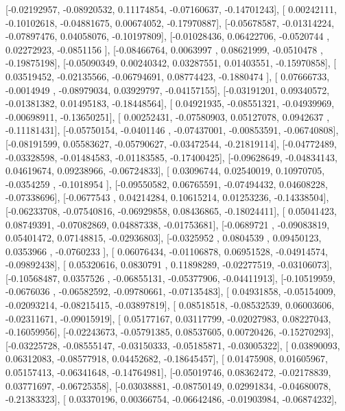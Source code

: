 \documentclass{article}
\begin{document}
       [-0.02192957, -0.08920532,  0.11174854, -0.07160637, -0.14701243],
       [ 0.00242111, -0.10102618, -0.04881675,  0.00674052, -0.17970887],
       [-0.05678587, -0.01314224, -0.07897476,  0.04058076, -0.10197809],
       [-0.01028436,  0.06422706, -0.0520744 ,  0.02272923, -0.0851156 ],
       [-0.08466764,  0.0063997 ,  0.08621999, -0.0510478 , -0.19875198],
       [-0.05090349,  0.00240342,  0.03287551,  0.01403551, -0.15970858],
       [ 0.03519452, -0.02135566, -0.06794691,  0.08774423, -0.1880474 ],
       [ 0.07666733, -0.0014949 , -0.08979034,  0.03929797, -0.04157155],
       [-0.03191201,  0.09340572, -0.01381382,  0.01495183, -0.18448564],
       [ 0.04921935, -0.08551321, -0.04939969, -0.00698911, -0.13650251],
       [ 0.00252431, -0.07580903,  0.05127078,  0.0942637 , -0.11181431],
       [-0.05750154, -0.0401146 , -0.07437001, -0.00853591, -0.06740808],
       [-0.08191599,  0.05583627, -0.05790627, -0.03472544, -0.21819114],
       [-0.04772489, -0.03328598, -0.01484583, -0.01183585, -0.17400425],
       [-0.09628649, -0.04834143,  0.04619674,  0.09238966, -0.06724833],
       [ 0.03096744,  0.02540019,  0.10970705, -0.0354259 , -0.1018954 ],
       [-0.09550582,  0.06765591, -0.07494432,  0.04608228, -0.07338696],
       [-0.0677543 ,  0.04214284,  0.10615214,  0.01253236, -0.14338504],
       [-0.06233708, -0.07540816, -0.06929858,  0.08436865, -0.18024411],
       [ 0.05041423,  0.08749391, -0.07082869,  0.04887338, -0.01753681],
       [-0.0689721 , -0.09083819,  0.05401472,  0.07148815, -0.02936803],
       [-0.0325952 ,  0.0804539 ,  0.09450123,  0.0353966 , -0.0760233 ],
       [ 0.06076434, -0.01106878,  0.06951528, -0.04914574, -0.09892438],
       [ 0.05320616,  0.0830791 ,  0.11898289, -0.02277519, -0.03106073],
       [-0.10568487,  0.0357526 , -0.06855131, -0.05377906, -0.04411913],
       [-0.10519959, -0.0676036 , -0.06582592, -0.09780661, -0.07135483],
       [ 0.04931858, -0.05154009, -0.02093214, -0.08215415, -0.03897819],
       [ 0.08518518, -0.08532539,  0.06003606, -0.02311671, -0.09015919],
       [ 0.05177167,  0.03117799, -0.02027983,  0.08227043, -0.16059956],
       [-0.02243673, -0.05791385,  0.08537605,  0.00720426, -0.15270293],
       [-0.03225728, -0.08555147, -0.03150333, -0.05185871, -0.03005322],
       [ 0.03890093,  0.06312083, -0.08577918,  0.04452682, -0.18645457],
       [ 0.01475908,  0.01605967,  0.05157413, -0.06341648, -0.14764981],
       [-0.05019746,  0.08362472, -0.02178839,  0.03771697, -0.06725358],
       [-0.03038881, -0.08750149,  0.02991834, -0.04680078, -0.21383323],
       [ 0.03370196,  0.00366754, -0.06642486, -0.01903984, -0.06874232],
\end{document}

